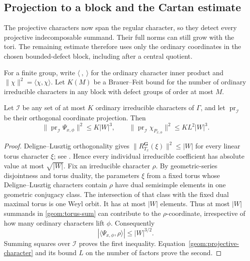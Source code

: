 \subsection{Projection to a block and the Cartan estimate}

The projective characters now span the regular character, so they
detect every projective indecomposable summand.  Their full norms
can still grow with the tori.  The remaining estimate therefore
uses only the ordinary coordinates in the chosen bounded-defect
block, including after a central quotient.

For a finite group, write \(\langle\ ,\ \rangle\) for the ordinary
character inner product and \(\|\chi\|^2=\langle\chi,\chi\rangle\).
Let \(K(M)\) be a Brauer--Feit bound for the number of ordinary
irreducible characters in any block with defect groups of order at
most \(M\).

\begin{lemma}\label{geom:projected-norm}
Let \(\mathcal I\) be any set of at most \(K\) ordinary irreducible
characters of \(\Gamma\), and let \(\operatorname{pr}_{\mathcal I}\)
be their orthogonal coordinate projection. Then
\[
 \|\operatorname{pr}_{\mathcal I}\Psi_{x,\phi}\|^2\le K|W|^3,
 \qquad
 \|\operatorname{pr}_{\mathcal I}\chi_{P_{x,\phi}}\|^2
       \le KL^2|W|^3.
\]
\end{lemma}

\begin{proof}
Deligne--Lusztig orthogonality gives
\(\|R_{T_x}^{\mathbf G}(\xi)\|^2\le |W|\)
for every linear torus character \(\xi\); see
\cite[Theorem 6.8 and Section 11]{DL}. Hence every individual
irreducible coefficient has absolute value at most \(\sqrt{|W|}\).
Fix an irreducible character \(\rho\). By geometric-series
disjointness and torus duality, the parameters \(\xi\) from a fixed
torus whose Deligne--Lusztig characters contain \(\rho\) have dual
semisimple elements in one geometric conjugacy class. The intersection
of that class with the fixed dual maximal torus is one Weyl orbit.
It has at most \(|W|\) elements. Thus at most \(|W|\) summands in
\eqref{geom:torus-sum} can contribute to the \(\rho\)-coordinate,
irrespective of how many ordinary characters lift \(\phi\).
Consequently
\[
 |\langle\Psi_{x,\phi},\rho\rangle|\le |W|^{3/2}.
\]
Summing squares over \(\mathcal I\) proves the first inequality.
Equation~\eqref{geom:projective-character} and its bound \(L\) on
the number of factors prove the second.
\end{proof}

